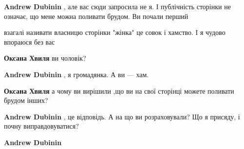 \begin{itemize}
\begin{itemize}
\textbf{Andrew Dubinin} , але вас сюди запросила не я. І публічність сторінки
не означає, що мене можна поливати брудом. Ви почали перший

 
взагалі називати власницю сторінки "жінка" це совок і хамство. І я чудово впораюся без вас

 
\textbf{Оксана Хвиля} ви чоловік?

 
\textbf{Andrew Dubinin} , я громадянка. А ви — хам.

 
\textbf{Оксана Хвиля} а чому ви вирішили ,що ви на свої сторінці можете поливати брудом інших?

 
\textbf{Andrew Dubinin} , це відповідь. А на що ви розраховували? Що я присяду,
і почну виправдовуватися?

 
\textbf{Andrew Dubinin} 


\end{itemize}
\end{itemize}
